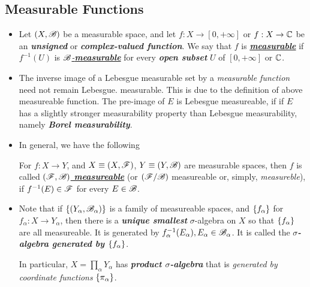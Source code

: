 \documentclass[11pt]{article}
\begin{document}
\subsection{Measurable Functions}
\begin{itemize}
\item \begin{definition}
Let $(X, {\mathscr B})$ be a measurable space, and let $f : X \rightarrow [0, +\infty]$ or $f: X \rightarrow {\mathbb C}$ be an \emph{\textbf{unsigned}} or \emph{\textbf{complex-valued function}}. We say that $f$ is \underline{\emph{\textbf{measurable}}} if $f^{-1}(U)$ is \underline{\emph{${\mathscr B}$-\textbf{measurable}}} for every \emph{\textbf{open subset}} $U$ of $[0, +\infty]$ or ${\mathbb C}$.
\end{definition}

\item \begin{remark}
The inverse image of a Lebesgue measurable set by a \emph{measurable function} need not remain Lebesgue. measurable. This is due to the definition of above measureable function. The pre-image of $E$ is Lebesgue measureable, if if $E$ has a slightly stronger measurability property than Lebesgue measurability, namely \emph{\textbf{Borel measurability}}.
\end{remark}

\item In general, we have the following
\begin{definition}
For $f: X\rightarrow Y$, and $X\equiv (X, {\mathscr F})$, $Y\equiv (Y, {\mathscr B})$ are measurable spaces, then $f$ is called \underline{\emph{\textbf{$({\mathscr F}, {\mathscr B})$ measureable}}} (or $({\mathscr F}/{\mathscr B})$ measureable or, simply, \emph{measureble}), if $f^{-1}(E) \in {\mathscr F}$ for every $E\in {\mathscr B}$.
\end{definition}

\item  \begin{definition} 
Note that if $\left\{(Y_{\alpha}, {\mathscr B}_{\alpha})\right\}$ is a family of measureable spaces, and $\left\{f_{\alpha}\right\}$ for $f_{\alpha}: X\rightarrow Y_{\alpha}$, then there is a \emph{\textbf{unique smallest}} $\sigma$-algebra on $X$ so that $\left\{f_{\alpha}\right\}$ are all measureable. It is generated by $f_{\alpha}^{-1}(E_{\alpha}), E_{\alpha}\in {\mathscr B}_{\alpha}$. It is called the \emph{\textbf{$\sigma$-algebra generated by $\left\{f_{\alpha}\right\}$}}. 

In particular, $X= \prod_{\alpha}Y_{\alpha}$ has \emph{\textbf{product $\sigma$-algebra}} that is \emph{generated by coordinate functions} $\left\{\pi_{\alpha}\right\}$.
\end{definition}


\end{itemize}
\end{document}
